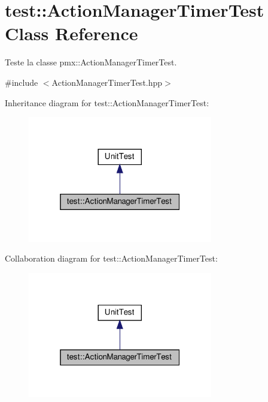\hypertarget{classtest_1_1ActionManagerTimerTest}{}\section{test\+:\+:Action\+Manager\+Timer\+Test Class Reference}
\label{classtest_1_1ActionManagerTimerTest}


Teste la classe pmx\+::\+Action\+Manager\+Timer\+Test.  




{\ttfamily \#include $<$Action\+Manager\+Timer\+Test.\+hpp$>$}



Inheritance diagram for test\+:\+:Action\+Manager\+Timer\+Test\+:
\nopagebreak
\begin{figure}[H]
\begin{center}
\leavevmode
\includegraphics[width=229pt]{classtest_1_1ActionManagerTimerTest__inherit__graph}
\end{center}
\end{figure}


Collaboration diagram for test\+:\+:Action\+Manager\+Timer\+Test\+:
\nopagebreak
\begin{figure}[H]
\begin{center}
\leavevmode
\includegraphics[width=229pt]{classtest_1_1ActionManagerTimerTest__coll__graph}
\end{center}
\end{figure}

